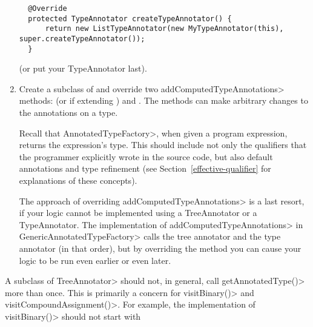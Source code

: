 \begin{enumerate}
\begin{Verbatim}
  @Override
  protected TypeAnnotator createTypeAnnotator() {
      return new ListTypeAnnotator(new MyTypeAnnotator(this), super.createTypeAnnotator());
  }
\end{Verbatim}

  \noindent
  (or put your TypeAnnotator last).

\item
  Create a subclass of  and
  override two \<addComputedTypeAnnotations> methods:
  (or
  if extending )
  and
  .
  The methods can make arbitrary changes to the annotations on a type.

  Recall that \<AnnotatedTypeFactory>, when given a program
  expression, returns the expression's type.  This should include not only
  the qualifiers that the programmer explicitly wrote in the source code, but
  also default annotations and type
  refinement (see Section~\ref{effective-qualifier} for explanations of these
  concepts).

  The approach of overriding \<addComputedTypeAnnotations> is a last
  resort, if your logic cannot be implemented using a TreeAnnotator or a
  TypeAnnotator.  The implementation of \<addComputedTypeAnnotations> in
  \<GenericAnnotatedTypeFactory> calls the tree annotator and the type
  annotator (in that order), but by overriding the method you can cause
  your logic to be run even earlier or even later.

\end{enumerate}



A subclass of \<TreeAnnotator> should not, in general, call
\<getAnnotatedType()> more than once.
This is primarily a concern for \<visitBinary()> and \<visitCompoundAssignment()>.
For example, the implementation of \<visitBinary()> should not start with

